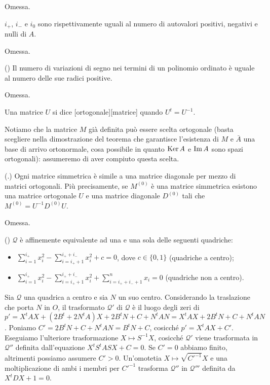 \Proof Omessa. \EndProof
\begin{Theorem}\label{th51bis}
	$i_+$, $i_-$ e $i_0$ sono rispettivamente uguali al numero di autovalori positivi, negativi e nulli di $A$.
\end{Theorem}
\Proof Omessa.\EndProof
\begin{Theorem}\label{th51tris}
	() Il numero di variazioni di segno nei termini di un polinomio ordinato \`e uguale al numero delle sue radici positive.
\end{Theorem}
\Proof Omessa.\EndProof
\begin{Definition}\label{def45}
	Una matrice $U$ si dice [ortogonale][matrice] quando $U^t = U^{-1}$.
\end{Definition}
	\par Notiamo che la matrice $M$ gi\`a definita pu\`o essere scelta ortogonale (basta scegliere nella dimostrazione del teorema che garantisce l'esistenza di $M$ e $\bar{A}$ una base di arrivo ortonormale, cosa possibile in quanto $\operatorname{Ker} A$ e $\operatorname{Im} A$ sono spazi ortogonali): assumeremo di aver compiuto questa scelta.
\begin{Theorem}\label{th52}
	(.) Ogni matrice simmetrica \`e simile a una matrice diagonale per mezzo di matrici ortogonali. Pi\`u precisamente, se $M^{(0)}$ \`e una matrice simmetrica esistono una matrice ortogonale $U$ e una matrice diagonale $D^{(0)}$ tali che $M^{(0)} = U^{-1}D^{(0)}U$.
\end{Theorem}
\Proof Omessa. \EndProof
\begin{Theorem}\label{th55}
	() $\mathcal{Q}$ \`e affinemente equivalente ad una e una sola delle seguenti quadriche:
	\begin{itemize}
		\item $\sum_{i = 1}^{i_+} x_i^2 - \sum_{i = i_+ + 1}^{i_+ + i_-} x_i^2 + c = 0$, dove $c \in \lbrace 0, 1 \rbrace$ (quadriche a centro);
		\item $\sum_{i = 1}^{i_+} x_i^2 - \sum_{i = i_+ + 1}^{i_+ + i_-} x_i^2 + \sum_{i = i_+ + i_- + 1}^n x_i = 0$ (quadriche non a centro).
	\end{itemize}
\end{Theorem}
\Proof Sia $\mathcal{Q}$ una quadrica a centro e sia $N$ un suo centro. Considerando la traslazione che porta $N$ in $O$, il trasformato $\mathcal{Q}'$ di $\mathcal{Q}$ \`e il luogo degli zeri di $p' = X^tAX + (2B^t + 2N^tA)X + 2B^tN + C + N^tAN = X^tAX + 2B^tN + C + N^tAN$. Poniamo $C' = 2B^tN + C + N^tAN = B^tN + C$, cosicch\'e $p' = X^tAX + C'$. Eseguiamo l'ulteriore trasformazione $X \mapsto S^{-1}X$, cosicch\'e $\mathcal{Q}'$ viene trasformata in $\mathcal{Q}''$ definita dall'equazione $X^tS^tASX + C = 0$. Se $C' = 0$ abbiamo finito, altrimenti possiamo assumere $C' > 0$. Un'omotetia $X \mapsto \sqrt{C'^{-1}}X$ e una moltiplicazione di ambi i membri per $C'^{-1}$ trasforma $\mathcal{Q}''$ in $\mathcal{Q}'''$ definita da $X^tDX + 1 = 0$.
